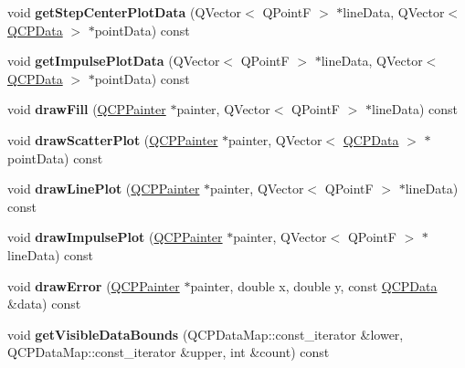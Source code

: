 \begin{DoxyCompactItemize}
\item 
\hypertarget{classQCPGraph_ac79dc75dd98db9948d9656447b463af5}{void {\bfseries get\-Step\-Center\-Plot\-Data} (Q\-Vector$<$ Q\-Point\-F $>$ $\ast$line\-Data, Q\-Vector$<$ \hyperlink{classQCPData}{Q\-C\-P\-Data} $>$ $\ast$point\-Data) const }\label{classQCPGraph_ac79dc75dd98db9948d9656447b463af5}

\item 
\hypertarget{classQCPGraph_a0ff6e856387cc079b28592ead2a81f6c}{void {\bfseries get\-Impulse\-Plot\-Data} (Q\-Vector$<$ Q\-Point\-F $>$ $\ast$line\-Data, Q\-Vector$<$ \hyperlink{classQCPData}{Q\-C\-P\-Data} $>$ $\ast$point\-Data) const }\label{classQCPGraph_a0ff6e856387cc079b28592ead2a81f6c}

\item 
\hypertarget{classQCPGraph_ad6d07926e6d6b7cfa70258780d47b7a0}{void {\bfseries draw\-Fill} (\hyperlink{classQCPPainter}{Q\-C\-P\-Painter} $\ast$painter, Q\-Vector$<$ Q\-Point\-F $>$ $\ast$line\-Data) const }\label{classQCPGraph_ad6d07926e6d6b7cfa70258780d47b7a0}

\item 
\hypertarget{classQCPGraph_af1872a60bed7acb3f3b17bfae3f4764c}{void {\bfseries draw\-Scatter\-Plot} (\hyperlink{classQCPPainter}{Q\-C\-P\-Painter} $\ast$painter, Q\-Vector$<$ \hyperlink{classQCPData}{Q\-C\-P\-Data} $>$ $\ast$point\-Data) const }\label{classQCPGraph_af1872a60bed7acb3f3b17bfae3f4764c}

\item 
\hypertarget{classQCPGraph_acebc22c3385829b19a87e6281fe6ade2}{void {\bfseries draw\-Line\-Plot} (\hyperlink{classQCPPainter}{Q\-C\-P\-Painter} $\ast$painter, Q\-Vector$<$ Q\-Point\-F $>$ $\ast$line\-Data) const }\label{classQCPGraph_acebc22c3385829b19a87e6281fe6ade2}

\item 
\hypertarget{classQCPGraph_abc01180629621f1e47e94559227d3d8c}{void {\bfseries draw\-Impulse\-Plot} (\hyperlink{classQCPPainter}{Q\-C\-P\-Painter} $\ast$painter, Q\-Vector$<$ Q\-Point\-F $>$ $\ast$line\-Data) const }\label{classQCPGraph_abc01180629621f1e47e94559227d3d8c}

\item 
\hypertarget{classQCPGraph_a4df6807066ce877705e999773e7ffbc4}{void {\bfseries draw\-Error} (\hyperlink{classQCPPainter}{Q\-C\-P\-Painter} $\ast$painter, double x, double y, const \hyperlink{classQCPData}{Q\-C\-P\-Data} \&data) const }\label{classQCPGraph_a4df6807066ce877705e999773e7ffbc4}

\item 
\hypertarget{classQCPGraph_a8963c90087cf53b889b29dd59aa41aad}{void {\bfseries get\-Visible\-Data\-Bounds} (Q\-C\-P\-Data\-Map\-::const\-\_\-iterator \&lower, Q\-C\-P\-Data\-Map\-::const\-\_\-iterator \&upper, int \&count) const }\label{classQCPGraph_a8963c90087cf53b889b29dd59aa41aad}


\end{DoxyCompactItemize}
